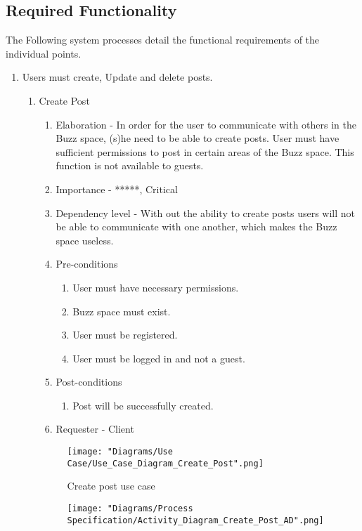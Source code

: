 \documentclass[12pt]{article}
\begin{document}
\newpage %
\subsection{Required Functionality}
The Following system processes detail the functional requirements of the individual points.
\begin{enumerate}
  \item Users must create, Update and delete posts. %
  	\begin{enumerate}
  		\item Create Post
  		\begin{enumerate}
    		\item Elaboration - In order for the user to communicate with others in the Buzz space, (s)he need to be able to 				create posts. User must have sufficient permissions to post in certain areas of the Buzz space. This function is not available to guests.
   	 		\item Importance - *****, Critical
   	 		\item Dependency level - With out the ability to create posts users will not be able to communicate with one another, which makes the Buzz space useless.
   	 		\item Pre-conditions
   			\begin{enumerate}
    			\item User must have necessary permissions.
    			\item Buzz space must exist.
    			\item User must be registered.
    			\item User must be logged in and not a guest.
    		\end{enumerate}
     		\item Post-conditions
    		\begin{enumerate}
  	  			\item Post will be successfully created.
   	 		\end{enumerate}
   	 		\item Requester - Client
  		\end{enumerate}
  	\begin{figure}[h]
  		\centering
  		\texttt{[image: "Diagrams/Use Case/Use\_Case\_Diagram\_Create\_Post".png]}
  		\caption{Create post use case}
  	\end{figure}
  	\begin{figure}[h]
  		\centering
  		\texttt{[image: "Diagrams/Process Specification/Activity\_Diagram\_Create\_Post\_AD".png]}

\end{figure}
\end{enumerate}
\end{enumerate}
\end{document}
